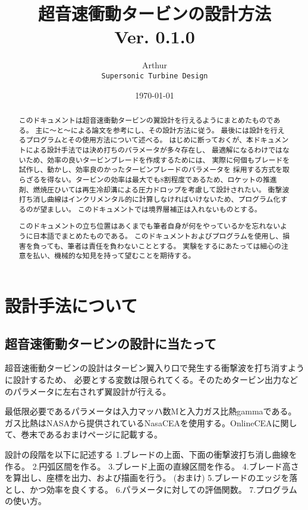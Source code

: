 \documentclass[a4j,10pt,oneside,openany]{jsbook}
\title{{\Huge \textbf{超音速衝動タービンの設計方法}}\\ {\small Ver. 0.1.0}}
\author{Arthur\\ \texttt{Supersonic Turbine Design}}
\date{\today}
\begin{document}
%
%
\maketitle
\frontmatter
\tableofcontents
%
%
\mainmatter

\chapter{設計手法について}
\begin{abstract}

このドキュメントは超音速衝動タービンの翼設計を行えるようにまとめたものである。
主に〜と〜による論文を参考にし、その設計方法に従う。
最後には設計を行えるプログラムとその使用方法について述べる。
はじめに断っておくが、本ドキュメントによる設計手法では決め打ちのパラメータが多々存在し、
最適解になるわけではないため、効率の良いタービンブレードを作成するためには、
実際に何個もブレードを試作し、動かし、効率良のかったタービンブレードのパラメータを
採用する方式を取らざるを得ない。タービンの効率は最大でも8割程度であるため、ロケットの推進剤、燃焼圧ひいては再生冷却溝による圧力ドロップを考慮して設計されたい。
衝撃波打ち消し曲線はインクリメンタル的に計算しなければいけないため、プログラム化するのが望ましい。
このドキュメントでは境界層補正は入れないものとする。

このドキュメントの立ち位置はあくまでも筆者自身が何をやっているかを忘れないように日本語でまとめたものである。
このドキュメントおよびプログラムを使用し、損害を負っても、筆者は責任を負わないこととする。
実験をするにあたっては細心の注意を払い、機械的な知見を持って望むことを期待する。

\end{abstract}

\section{超音速衝動タービンの設計に当たって}
超音速衝動タービンの設計はタービン翼入り口で発生する衝撃波を打ち消すように設計するため、
必要とする変数は限られてくる。そのためタービン出力などのパラメータに左右されず翼設計が行える。

最低限必要であるパラメータは入力マッハ数Mと入力ガス比熱gammaである。
ガス比熱はNASAから提供されているNasaCEAを使用する。OnlineCEAに関して、巻末であるおまけページに記載する。

設計の段階を以下に記述する
1.ブレードの上面、下面の衝撃波打ち消し曲線を作る。
2.円弧区間を作る。
3.ブレード上面の直線区間を作る。
4.ブレード高さを算出し、座標を出力、および描画を行う。
(おまけ)
5.ブレードのエッジを落とし、かつ効率を良くする。
6.パラメータに対しての評価関数。
7.プログラムの使い方。
\end{document}
